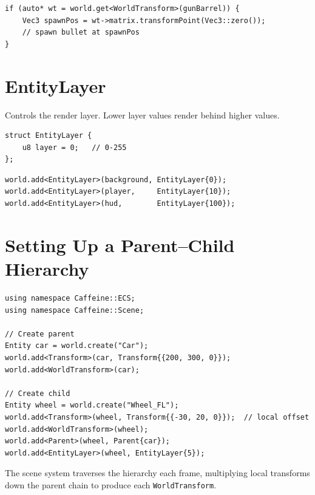 \begin{lstlisting}
if (auto* wt = world.get<WorldTransform>(gunBarrel)) {
    Vec3 spawnPos = wt->matrix.transformPoint(Vec3::zero());
    // spawn bullet at spawnPos
}
\end{lstlisting}

\section{EntityLayer}

Controls the render layer. Lower layer values render behind higher values.

\begin{lstlisting}
struct EntityLayer {
    u8 layer = 0;   // 0-255
};
\end{lstlisting}

\begin{lstlisting}
world.add<EntityLayer>(background, EntityLayer{0});
world.add<EntityLayer>(player,     EntityLayer{10});
world.add<EntityLayer>(hud,        EntityLayer{100});
\end{lstlisting}

\section{Setting Up a Parent--Child Hierarchy}

\begin{lstlisting}
using namespace Caffeine::ECS;
using namespace Caffeine::Scene;

// Create parent
Entity car = world.create("Car");
world.add<Transform>(car, Transform{{200, 300, 0}});
world.add<WorldTransform>(car);

// Create child
Entity wheel = world.create("Wheel_FL");
world.add<Transform>(wheel, Transform{{-30, 20, 0}});  // local offset
world.add<WorldTransform>(wheel);
world.add<Parent>(wheel, Parent{car});
world.add<EntityLayer>(wheel, EntityLayer{5});
\end{lstlisting}

The scene system traverses the hierarchy each frame, multiplying local
transforms down the parent chain to produce each \texttt{WorldTransform}.

